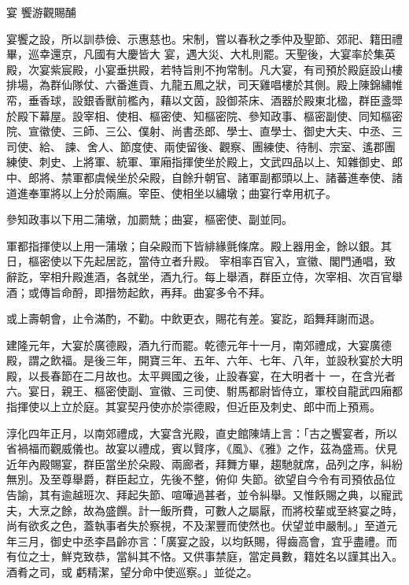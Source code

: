 
\begin{pinyinscope}

 宴
 饗游觀賜酺



 宴饗之設，所以訓恭儉、示惠慈也。宋制，嘗以春秋之季仲及聖節、郊祀、籍田禮畢，巡幸還京，凡國有大慶皆大
 宴，遇大災、大札則罷。天聖後，大宴率於集英殿，次宴紫宸殿，小宴垂拱殿，若特旨則不拘常制。凡大宴，有司預於殿庭設山樓排場，為群仙隊仗、六番進貢、九龍五鳳之狀，司天雞唱樓於其側。殿上陳錦繡帷帟，垂香球，設銀香獸前檻內，藉以文茵，設御茶床、酒器於殿東北楹，群臣盞斝於殿下幕屋。設宰相、使相、樞密使、知樞密院、參知政事、樞密副使、同知樞密院、宣徽使、三師、三公、僕射、尚書丞郎、學士、直學士、御史大夫、中丞、三司使、給、
 諫、舍人、節度使、兩使留後、觀察、團練使、待制、宗室、遙郡團練使、刺史、上將軍、統軍、軍廂指揮使坐於殿上，文武四品以上、知雜御史、郎中、郎將、禁軍都虞候坐於朵殿，自餘升朝官、諸軍副都頭以上、諸蕃進奉使、諸道進奉軍將以上分於兩廡。宰臣、使相坐以繡墩；曲宴行幸用杌子。



 參知政事以下用二蒲墩，加罽兟；曲宴，樞密使、副並同。



 軍都指揮使以上用一蒲墩；自朵殿而下皆緋緣氈條席。殿上器用金，餘以銀。其日，樞密使以下先起居訖，當侍立者升殿。
 宰相率百官入，宣徽、閣門通唱，致辭訖，宰相升殿進酒，各就坐，酒九行。每上舉酒，群臣立侍，次宰相、次百官舉酒；或傳旨命酹，即搢笏起飲，再拜。曲宴多令不拜。



 或上壽朝會，止令滿酌，不勸。中飲更衣，賜花有差。宴訖，蹈舞拜謝而退。



 建隆元年，大宴於廣德殿，酒九行而罷。乾德元年十一月，南郊禮成，大宴廣德殿，謂之飲福。是後三年，開寶三年、五年、六年、七年、八年，並設秋宴於大明殿，以長春節在二月故也。太平興國之後，止設春宴，在大明者十
 一，在含光者六。宴日，親王、樞密使副、宣徽、三司使、駙馬都尉皆侍立，軍校自龍武四廂都指揮使以上立於庭。其宴契丹使亦於崇德殿，但近臣及刺史、郎中而上預焉。



 淳化四年正月，以南郊禮成，大宴含光殿，直史館陳靖上言：「古之饗宴者，所以省禍福而觀威儀也。故宴以禮成，賓以賢序，《風》、《雅》之作，茲為盛焉。伏見近年內殿賜宴，群臣當坐於朵殿、兩廊者，拜舞方畢，趨馳就席，品列之序，糾紛無別。及至尊舉爵，群臣起立，先後不整，俯仰
 失節。欲望自今令有司預依品位告諭，其有逾越班次、拜起失節、喧嘩過甚者，並令糾舉。又惟飫賜之典，以寵武夫，大烹之餘，故為盛饌。計一飯所費，可數人之屬厭，而將校輩或至終宴之時，尚有欲炙之色，蓋執事者失於察視，不及潔豐而使然也。伏望並申嚴制。」至道元年三月，御史中丞李昌齡亦言：「廣宴之設，以均飫賜，得齒高會，宜乎盡禮。而有位之士，鮮克致恭，當糾其不恪。又供事禁庭，當定員數，籍姓名以謹其出入。酒肴之司，或
 虧精潔，望分命中使巡察。」並從之。




\end{pinyinscope}
